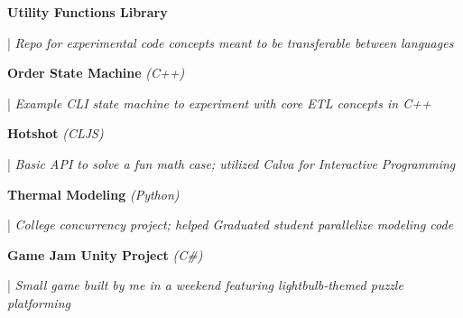 \documentclass[letterpaper,11pt]{article}
\begin{document}
\begin{minipage}[t]{0.28\textwidth}
	\raggedright
	\textbf{ Utility Functions Library } \\
\end{minipage}
\hfill
\begin{minipage}[t]{0.70\textwidth}
	\raggedright
	|\textit{ Repo for experimental code concepts meant to be transferable between languages } \\
\end{minipage}

\begin{minipage}[t]{0.28\textwidth}
	\raggedright
	\textbf{ Order State Machine }\textit{(C++)}\\
\end{minipage}
\hfill
\begin{minipage}[t]{0.70\textwidth}
	\raggedright
	|\textit{ Example CLI state machine to experiment with core ETL concepts in C++ } \\
\end{minipage}

\begin{minipage}[t]{0.28\textwidth}
	\raggedright
	\textbf{ Hotshot }\textit{(CLJS)}\\
\end{minipage}
\hfill
\begin{minipage}[t]{0.70\textwidth}
	\raggedright
	|\textit{ Basic API to solve a fun math case; utilized Calva for Interactive Programming  } \\
\end{minipage}

\begin{minipage}[t]{0.28\textwidth}
	\raggedright
	\textbf{ Thermal Modeling }\textit{(Python)}\\
\end{minipage}
\hfill
\begin{minipage}[t]{0.70\textwidth}
	\raggedright
	|\textit{ College concurrency project; helped Graduated student parallelize modeling code } \\
\end{minipage}

\begin{minipage}[t]{0.28\textwidth}
	\raggedright
	\textbf{ Game Jam Unity Project }\textit{(C\#)} \\
\end{minipage}
\hfill
\begin{minipage}[t]{0.70\textwidth}
	\raggedright
	|\textit{ Small game built by me in a weekend featuring lightbulb-themed puzzle platforming} \\
\end{minipage}
\end{document}
